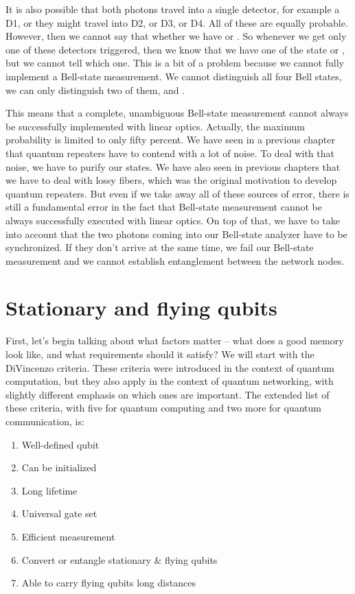 It is also possible that both photons travel into a single detector, for example a D1, or they might travel into D2, or D3, or D4. All of these are equally probable. However, then we cannot say that whether we have \ket{\Phi^+} or \ket{\Phi^-}. So whenever we get only one of these detectors triggered, then we know that we have one of the state \ket{\Psi^+} or \ket{\Psi^-}, but we cannot tell which one. This is a bit of a problem because we cannot fully implement a Bell-state measurement. We cannot distinguish all four Bell states, we can only distinguish two of them, \ket{\Psi^+} and \ket{\Psi^-}.


This means that a complete, unambiguous Bell-state measurement cannot always be successfully implemented with linear optics. Actually, the maximum probability is limited to only fifty percent. We have seen in a previous chapter that quantum repeaters have to contend with a lot of noise. To deal with that noise, we have to purify our states. We have also seen in previous chapters that we have to deal with lossy fibers, which was the original motivation to develop quantum repeaters. But even if we take away all of these sources of error, there is still a fundamental error in the fact that Bell-state measurement cannot be always successfully executed with linear optics. On top of that, we have to take into account that the two photons coming into our Bell-state analyzer have to be synchronized. If they don't arrive at the same time, we fail our Bell-state measurement and we cannot establish entanglement between the network nodes.



\section{Stationary and flying qubits}

First, let's begin talking about what factors matter -- what does a good memory look like, and what requirements should it satisfy?  We will start with the DiVincenzo criteria. These criteria were introduced in the context of quantum computation, but they also apply in the context of quantum networking, with slightly different emphasis on which ones are important.  The extended list of these criteria, with five for quantum computing and two more for quantum communication, is:

\begin{enumerate}
    \item Well-defined qubit
    \item Can be initialized
    \item Long lifetime
    \item Universal gate set
    \item Efficient measurement
    \item Convert or entangle stationary \& flying qubits
    \item Able to carry flying qubits long distances
\end{enumerate}

